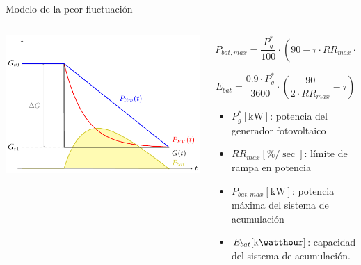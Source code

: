 \documentclass[aspectratio=169, usenames,svgnames,dvipsnames]{beamer}
\begin{document}
\begin{frame}[label={sec:org230a95b}]{Modelo de la peor fluctuación}
\begin{columns}
\begin{column}{0.4\columnwidth}
\begin{center}
\includegraphics[width=\textwidth]{../figs/ModeloPeorFluctuacion.pdf}
\end{center}
\end{column}

\begin{column}{0.6\columnwidth}
\[
  P_{bat,max} = \frac{P_g^*}{100} \cdot \left(90 - \tau \cdot RR_{max} \cdot \left( 1 + \ln\frac{90}{\tau \cdot RR_{max}}\right) \right)
\]

\[
  E_{bat} = \frac{0.9 \cdot P_g^*}{3600} \cdot \left( \frac{90}{2 \cdot RR_{max}} - \tau \right)
\]

\begin{itemize}
\item \(P_g^* [\unit{\kilo\watt}]\): potencia del generador fotovoltaico
\item \(RR_{max} [\unit{\%\per\sec}]\): límite de rampa en potencia
\item \(P_{bat,max} [\unit{\kilo\watt}]\): potencia máxima del sistema de acumulación
\item \(E_{bat} [\unit{\kilo\watthour}]\): capacidad del sistema de acumulación.
\end{itemize}
\end{column}
\end{columns}
\end{frame}
\end{document}
